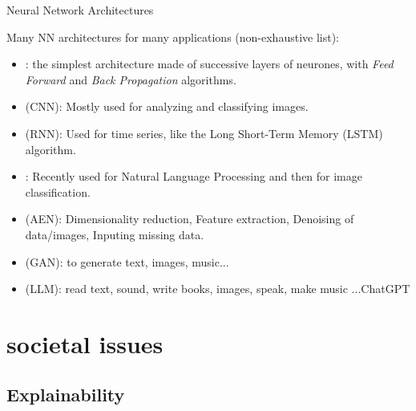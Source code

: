 \documentclass[10pt,serif,mathserif,compress,hyperref={colorlinks}]{beamer}
\begin{document}
\begin{frame}{Neural Network Architectures}

Many NN architectures for many applications (non-exhaustive list):
\begin{itemize}
  \item {}: the simplest architecture made of successive layers of neurones, with {\em Feed Forward} and {\em Back Propagation} algorithms.
  \item {} (CNN): Mostly used for analyzing and classifying images.
  \item {} (RNN): Used for time series, like the Long Short-Term Memory (LSTM) algorithm.
  \item {} : Recently used for Natural Language Processing and then for image classification.
  \item {} (AEN): Dimensionality reduction, Feature extraction, Denoising of data/images, Inputing missing data.
  \item {} (GAN): to generate text, images, music...
  \item {} (LLM): read text, sound, write books, images, speak, make music ...ChatGPT
\end{itemize}
{\small\centering[Synthetic Graphical chart: \href{https://chart-studio.plotly.com/~SolClover/90.embed?autosize=true&referrer=https\%3A\%2F\%2Ftowardsdatascience.com\%2F}{from Saul Dobilas on Medium}] }
\end{frame}

\section{societal issues}

\subsection{Explainability}
\end{document}
